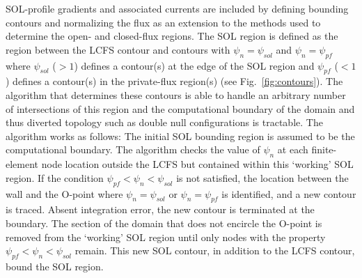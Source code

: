\documentclass[english,aps,superscriptaddress,showkeys,showpacs,prepri,twocolumn]{revtex4}
\begin{document}

SOL-profile gradients and associated currents are included by defining bounding
contours and normalizing the flux as an extension to the methods used to
determine the open- and closed-flux regions.  The SOL region is defined as the
region between the LCFS contour and contours with $\psi_n=\psi_{sol}$ and
$\psi_n=\psi_{pf}$ where $\psi_{sol}$ ($>1$) defines a contour(s) at the edge
of the SOL region and $\psi_{pf}$ ($<1$) defines a contour(s) in the
private-flux region(s) (see Fig.~\ref{fig:contours}).  
The algorithm that
determines these contours is able to handle an arbitrary number of
intersections of this region and the computational boundary of the domain and
thus diverted topology such as double null configurations is tractable.  The
algorithm works as follows: The initial SOL bounding region is assumed to be
the computational boundary.  The algorithm checks the value of $\psi_n$ at each
finite-element node location outside the LCFS but contained within this
`working' SOL region.  If the condition $\psi_{pf}<\psi_n<\psi_{sol}$ is not
satisfied, the location between the wall and the O-point where
$\psi_n=\psi_{sol}$ or $\psi_n=\psi_{pf}$ is identified, and a new contour is
traced. Absent integration error, the new contour is terminated at the
boundary. The section of the domain that does not encircle the O-point is
removed from the `working' SOL region until only nodes with the property
$\psi_{pf}<\psi_n<\psi_{sol}$ remain. This new SOL contour, in addition to the
LCFS contour, bound the SOL region. 
\end{document}
